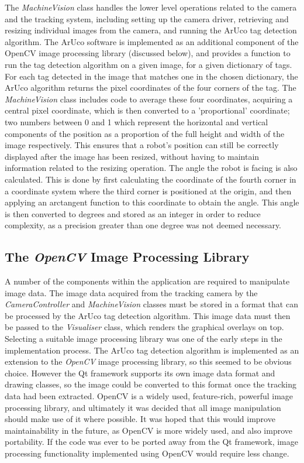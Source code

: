 The \textit{MachineVision} class handles the lower level operations related to the camera and the tracking system, including setting up the camera driver, retrieving and resizing individual images from the camera, and running the ArUco tag detection algorithm. The ArUco software is implemented as an additional component of the OpenCV image processing library (discussed below), and provides a function to run the tag detection algorithm on a given image, for a given dictionary of tags. For each tag detected in the image that matches one in the chosen dictionary, the ArUco algorithm returns the pixel coordinates of the four corners of the tag. The \textit{MachineVision} class includes code to average these four coordinates, acquiring a central pixel coordinate, which is then converted to a 'proportional' coordinate; two numbers between 0 and 1 which represent the horizontal and vertical components of the position as a proportion of the full height and width of the image respectively. This ensures that a robot's position can still be correctly displayed after the image has been resized, without having to maintain information related to the resizing operation. The angle the robot is facing is also calculated. This is done by first calculating the coordinate of the fourth corner in a coordinate system where the third corner is positioned at the origin, and then applying an arctangent function to this coordinate to obtain the angle. This angle is then converted to degrees and stored as an integer in order to reduce complexity, as a precision greater than one degree was not deemed necessary.


\subsection{The \textit{OpenCV} Image Processing Library}
A number of the components within the application are required to manipulate image data. The image data acquired from the tracking camera by the \textit{CameraController} and \textit{MachineVision} classes must be stored in a format that can be processed by the ArUco tag detection algorithm. This image data must then be passed to the \textit{Visualiser} class, which renders the graphical overlays on top. Selecting a suitable image processing library was one of the early steps in the implementation process. The ArUco tag detection algorithm is implemented as an extension to the \textit{OpenCV} image processing library, so this seemed to be obvious choice. However the Qt framework supports its own image data format and drawing classes, so the image could be converted to this format once the tracking data had been extracted. OpenCV is a widely used, feature-rich, powerful image processing library, and ultimately it was decided that all image manipulation should make use of it where possible. It was hoped that this would improve maintainability in the future, as OpenCV is more widely used, and also improve portability. If the code was ever to be ported away from the Qt framework, image processing functionality implemented using OpenCV would require less change.

